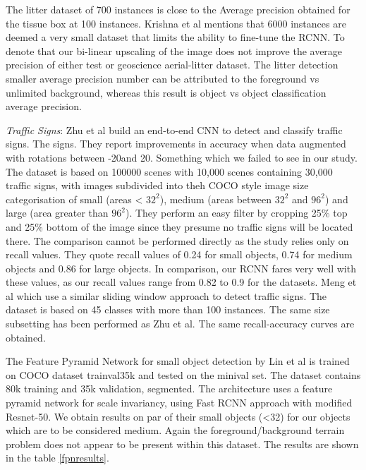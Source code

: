 \documentclass{IEEEtran}
\begin{document}
The litter dataset of 700 instances is close to the Average precision obtained for the tissue box at 100 instances. Krishna et al \cite{Krishna} mentions that 6000 instances are deemed a very small dataset that limits the ability to fine-tune the RCNN. To denote that our bi-linear upscaling of the image does not improve the average precision of either test or geoscience aerial-litter dataset. The litter detection smaller average precision number can be attributed to the foreground vs unlimited background, whereas this result is object vs object classification average precision.\newline

\textit{Traffic Signs}: Zhu et al \cite{Zhu2016} build an end-to-end CNN to detect and classify traffic signs. The signs. They report improvements in accuracy when data augmented with rotations between -20\degree and 20\degree. Something which we failed to see in our study. The dataset is based on 100000 scenes with 10,000 scenes containing 30,000 traffic signs, with images subdivided into theh COCO style image size categorisation of small (areas < $32^2$), medium (areas between $32^2$ and $96^2$) and large (area greater than $96^2$). They perform an easy filter by cropping 25\% top and 25\% bottom of the image since they presume no traffic signs will be located there. The comparison cannot be performed directly as the study relies only on recall values. They quote recall values of 0.24 for small objects, 0.74 for medium objects and 0.86 for large objects. In comparison, our RCNN fares very well with these values, as our recall values range from 0.82 to 0.9 for the datasets. Meng et al \cite{Meng2017} which use a similar sliding window approach to detect traffic signs. The dataset is based on 45 classes with more than 100 instances. The same size subsetting has been performed as Zhu et al\cite{Zhu2016}. The same recall-accuracy curves are obtained. \newline

The Feature Pyramid Network for small object detection by Lin et al \cite{Lin2017a} is trained on COCO dataset trainval35k and tested on the minival set. The dataset contains 80k training and 35k validation, segmented. The architecture uses a feature pyramid network for scale invariancy, using Fast RCNN approach with modified Resnet-50. We obtain results on par of their small objects (<32) for our objects which are to be considered medium. Again the foreground/background terrain problem does not appear to be present within this dataset. The results are shown in the table \ref{fpnresults}.
\end{document}

